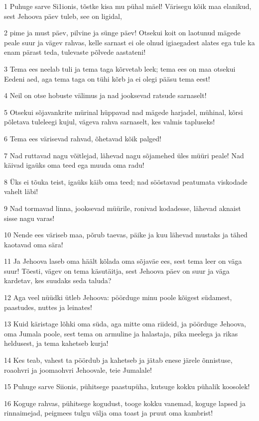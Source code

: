 \par 1 Puhuge sarve Si1ionis, tõstke kisa mu pühal mäel! Värisegu kõik maa elanikud, sest Jehoova päev tuleb, see on ligidal,
\par 2 pime ja must päev, pilvine ja sünge päev! Otsekui koit on laotunud mägede peale suur ja vägev rahvas, kelle sarnast ei ole olnud igiaegadest alates ega tule ka enam pärast teda, tulevaste põlvede aastateni!
\par 3 Tema ees neelab tuli ja tema taga kõrvetab leek; tema ees on maa otsekui Eedeni aed, aga tema taga on tühi kõrb ja ei olegi pääsu tema eest!
\par 4 Neil on otse hobuste välimus ja nad jooksevad ratsude sarnaselt!
\par 5 Otsekui sõjavankrite mürinal hüppavad nad mägede harjadel, mühinal, kõrsi põletava tuleleegi kujul, vägeva rahva sarnaselt, kes valmis tapluseks!
\par 6 Tema ees värisevad rahvad, õhetavad kõik palged!
\par 7 Nad ruttavad nagu võitlejad, lähevad nagu sõjamehed üles müüri peale! Nad käivad igaüks oma teed ega muuda oma radu!
\par 8 Üks ei tõuka teist, igaüks käib oma teed; nad sööstavad peatumata viskodade vahelt läbi!
\par 9 Nad tormavad linna, jooksevad müürile, ronivad kodadesse, lähevad aknaist sisse nagu varas!
\par 10 Nende ees väriseb maa, põrub taevas, päike ja kuu lähevad mustaks ja tähed kaotavad oma sära!
\par 11 Ja Jehoova laseb oma häält kõlada oma sõjaväe ees, sest tema leer on väga suur! Tõesti, vägev on tema käsutäitja, sest Jehoova päev on suur ja väga kardetav, kes suudaks seda taluda?
\par 12 Aga veel nüüdki ütleb Jehoova: pöörduge minu poole kõigest südamest, paastudes, nuttes ja leinates!
\par 13 Kuid käristage lõhki oma süda, aga mitte oma riideid, ja pöörduge Jehoova, oma Jumala poole, sest tema on armuline ja halastaja, pika meelega ja rikas heldusest, ja tema kahetseb kurja!
\par 14 Kes teab, vahest ta pöördub ja kahetseb ja jätab enese järele õnnistuse, roaohvri ja joomaohvri Jehoovale, teie Jumalale!
\par 15 Puhuge sarve Siionis, pühitsege paastupüha, kutsuge kokku pühalik koosolek!
\par 16 Koguge rahvas, pühitsege kogudust, tooge kokku vanemad, koguge lapsed ja rinnaimejad, peigmees tulgu välja oma toast ja pruut oma kambrist!
